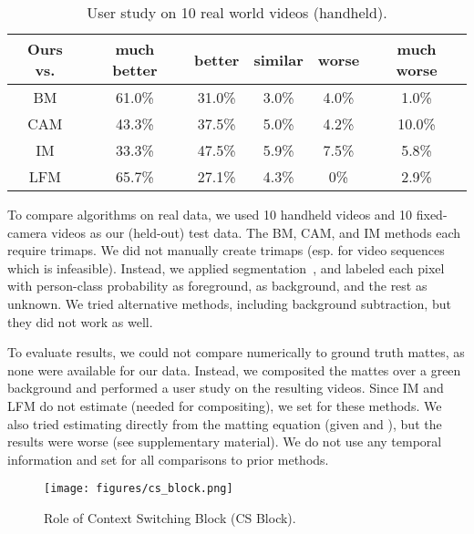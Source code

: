 \documentclass[10pt,twocolumn,letterpaper]{article}
\begin{document}
\begin{table}[!h]
\setlength\tabcolsep{2pt}
	\centering
	\small
	\captionsetup{justification=centering}
    	\vspace{-.5em}
		\begin{tabular}{c|ccccc}
			\toprule
			 Ours vs. &  much better & better & similar & worse & much worse \\ 
			 \midrule
			 BM & 61.0\% & 31.0\% & 3.0\% & 4.0\% & 1.0\% \\
			 CAM & 43.3\% & 37.5\% & 5.0\% & 4.2\% & 10.0\%\\
			 IM & 33.3\% & 47.5\% & 5.9\% & 7.5\% & 5.8\%\\
			 LFM & 65.7\% & 27.1\% & 4.3\% & 0\% & 2.9\%\\
			\bottomrule
		\end{tabular}
		\vspace{-.5em}
		\caption{\small User study on 10 real world videos (handheld).}
	\vspace{-1em}
	\label{tab:real-hand}
\end{table}



To compare algorithms on real data, we used 10 handheld videos and 10 fixed-camera videos as our (held-out) test data.  The BM, CAM, and IM methods each require trimaps.  We did not manually create trimaps (esp. for video sequences which is infeasible).  Instead, we applied segmentation~\cite{deeplabv3plus2018}, and labeled each pixel with person-class probability  as foreground,  as background, and the rest as unknown. We tried alternative methods, including background subtraction, but they did not work as well.



To evaluate results, we could not compare numerically to ground truth mattes, as none were available for our data.  Instead, we composited the mattes over a green background and performed a user study on the resulting videos. Since IM and LFM do not estimate  (needed for compositing), we set  for these methods.  We also tried estimating  directly from the matting equation (given  and ), but the results were worse (see supplementary material). We do not use any temporal information and set  for all comparisons to prior methods.





\begin{figure}[ht!]
	\centering
	\texttt{[image: figures/cs\_block.png]}    \vspace{-0.5em}
	\caption{\small Role of Context Switching Block (CS Block).} 
	\vspace{-0.5em}
	\label{fig:cs_block}
\end{figure}
\end{document}
